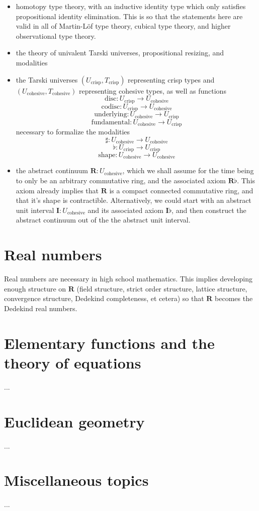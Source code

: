\documentclass[one]{article}
\begin{document}
\begin{itemize}
\item homotopy type theory, with an inductive identity type which only satisfies propositional identity elimination. This is so that the statements here are valid in all of Martin-Löf type theory, cubical type theory, and higher observational type theory. 

\item the theory of univalent Tarski universes, propositional resizing, and modalities

\item the Tarski universes $(U_\mathrm{crisp}, T_\mathrm{crisp})$ representing crisp types and $(U_\mathrm{cohesive}, T_\mathrm{cohesive})$ representing cohesive types, as well as functions 
$$\mathrm{disc}:U_\mathrm{crisp} \to U_\mathrm{cohesive}$$ 
$$\mathrm{codisc}:U_\mathrm{crisp} \to U_\mathrm{cohesive}$$
$$\mathrm{underlying}:U_\mathrm{cohesive} \to U_\mathrm{crisp}$$ 
$$\mathrm{fundamental}:U_\mathrm{cohesive} \to U_\mathrm{crisp}$$ 
necessary to formalize the modalities 
$$\sharp:U_\mathrm{cohesive} \to U_\mathrm{cohesive}$$
$$\flat:U_\mathrm{crisp} \to U_\mathrm{crisp}$$
$$\mathrm{shape}:U_\mathrm{cohesive} \to U_\mathrm{cohesive}$$

\item the abstract continuum $\mathbf{R}:U_\mathrm{cohesive}$, which we shall assume for the time being to only be an arbitrary commutative ring, and the associated axiom $\mathbf{R} \flat$. This axiom already implies that $\mathbf{R}$ is a compact connected commutative ring, and that it's shape is contractible. Alternatively, we could start with an abstract unit interval $\mathbf{I}:U_\mathrm{cohesive}$ and its associated axiom $\mathbf{I} \flat$, and then construct the abstract continuum out of the the abstract unit interval. 
\end{itemize}

\section{Real numbers}

Real numbers are necessary in high school mathematics. This implies developing enough structure on $\mathbf{R}$ (field structure, strict order structure, lattice structure, convergence structure, Dedekind completeness, et cetera) so that $\mathbf{R}$ becomes the Dedekind real numbers. 

\section{Elementary functions and the theory of equations}

...

\section{Euclidean geometry}

...

\section{Miscellaneous topics}

...
\end{document}

